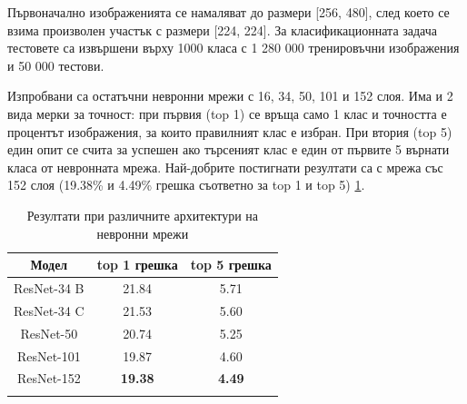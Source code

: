 Първоначално изображенията се намаляват до размери [256, 480], след което се взима произволен участък с размери [224, 224]. За класификационната задача тестовете са извършени върху 1000 класа с 1 280 000 тренировъчни изображения и 50 000 тестови.

Изпробвани са остатъчни невронни мрежи с 16, 34, 50, 101 и 152 слоя. Има и 2 вида мерки за точност: при първия (top 1) се връща само 1 клас и точността е процентът изображения, за които правилният клас е избран. При втория (top 5) един опит се счита за успешен ако търсеният клас е един от първите 5 върнати класа от невронната мрежа. Най-добрите постигнати резултати са с мрежа със 152 слоя (19.38\% и 4.49\% грешка съответно за top 1 и top 5) \ref{tab:table_results_architectures}.

\begin{longtable}{ | c | c | c | }
\hline
\textbf{Модел} & \textbf{top 1 грешка} & \textbf{top 5 грешка} \\ \hline \hline
ResNet-34 B & 21.84 & 5.71 \\ \hline
ResNet-34 C & 21.53 & 5.60 \\ \hline
ResNet-50   & 20.74 & 5.25 \\ \hline
ResNet-101  & 19.87 & 4.60 \\ \hline
ResNet-152  & \textbf{19.38} & \textbf{4.49} \\ \hline
\caption{Резултати при различните архитектури на невронни мрежи \cite{He2015} }
\label{tab:table_results_architectures}
\end{longtable}
